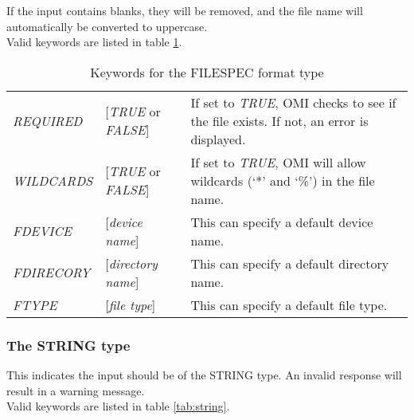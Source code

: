 \documentclass[a4paper]{book}
\begin{document}
If the input contains blanks, they will be removed, and the file name will 
automatically be converted to uppercase. \\
Valid keywords are listed in table \ref{tab:filespec}.

\begin{table}[h!tb]
\begin{minipage}[h!tb]{\textwidth}
\begin{tabular}{llp{6cm}} \hline
\textsl{REQUIRED} & [\textsl{TRUE} or \textsl{FALSE}] & If set to \textsl{TRUE}, OMI checks to see if the file exists. If not, an error is displayed.\\
\textsl{WILDCARDS} & [\textsl{TRUE} or \textsl{FALSE}] & If set to \textsl{TRUE}, OMI will allow wildcards (`*' and `\%') in the file name.\\
\textsl{FDEVICE} & [\textit{device name}] & This can specify a default device name. \\
\textsl{FDIRECORY} & [\textit{directory name}] & This can specify a default directory name. \\
\textsl{FTYPE} & [\textit{file type}] & This can specify a default file type. \\ \hline
\end{tabular}
\caption{Keywords for the FILESPEC format type}\label{tab:filespec}
\end{minipage}
\end{table}

\subsubsection{The STRING type}

This indicates the input should be of the \textsf{STRING} 
type. An invalid response will 
result in a warning message. \\
Valid keywords are listed in table \ref{tab:string}.
\end{document}
